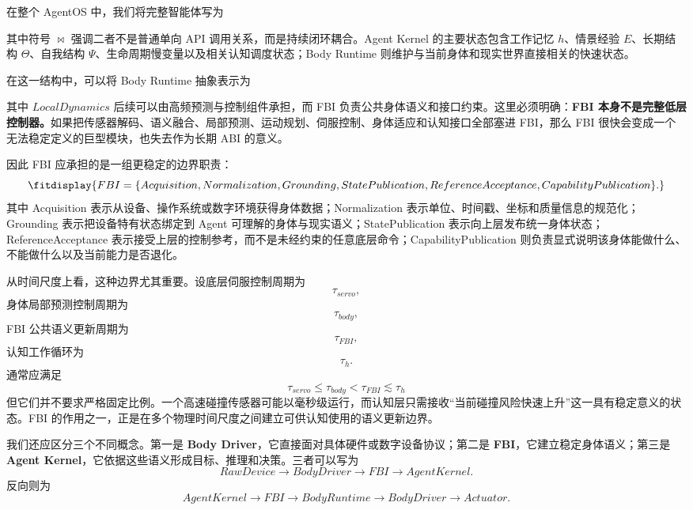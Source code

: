 在整个 AgentOS 中，我们将完整智能体写为
\begin{statementbox}
\centering
{}
\end{statementbox}
其中符号 \(\bowtie\) 强调二者不是普通单向 API 调用关系，而是持续闭环耦合。Agent Kernel 的主要状态包含工作记忆 \(h\)、情景经验 \(E\)、长期结构 \(\Theta\)、自我结构 \(\Psi\)、生命周期慢变量以及相关认知调度状态；Body Runtime 则维护与当前身体和现实世界直接相关的快速状态。

在这一结构中，可以将 Body Runtime 抽象表示为
\begin{statementbox}
\centering
{}
\end{statementbox}
其中 \(LocalDynamics\) 后续可以由高频预测与控制组件承担，而 FBI 负责公共身体语义和接口约束。这里必须明确：\textbf{FBI 本身不是完整低层控制器。}如果把传感器解码、语义融合、局部预测、运动规划、伺服控制、身体适应和认知接口全部塞进 FBI，那么 FBI 很快会变成一个无法稳定定义的巨型模块，也失去作为长期 ABI 的意义。

因此 FBI 应承担的是一组更稳定的边界职责：
\[
\fitdisplay{
FBI
=
\{
Acquisition,
Normalization,
Grounding,
StatePublication,
ReferenceAcceptance,
CapabilityPublication
\}.
}
\]
其中 Acquisition 表示从设备、操作系统或数字环境获得身体数据；Normalization 表示单位、时间戳、坐标和质量信息的规范化；Grounding 表示把设备特有状态绑定到 Agent 可理解的身体与现实语义；StatePublication 表示向上层发布统一身体状态；ReferenceAcceptance 表示接受上层的控制参考，而不是未经约束的任意底层命令；CapabilityPublication 则负责显式说明该身体能做什么、不能做什么以及当前能力是否退化。

从时间尺度上看，这种边界尤其重要。设底层伺服控制周期为
\[
\tau_{servo},
\]
身体局部预测控制周期为
\[
\tau_{body},
\]
FBI 公共语义更新周期为
\[
\tau_{FBI},
\]
认知工作循环为
\[
\tau_h.
\]
通常应满足
\[
\boxed{
\tau_{servo}
\leq
\tau_{body}
<
\tau_{FBI}
\lesssim
\tau_h
}
\]
但它们并不要求严格固定比例。一个高速碰撞传感器可能以毫秒级运行，而认知层只需接收“当前碰撞风险快速上升”这一具有稳定意义的状态。FBI 的作用之一，正是在多个物理时间尺度之间建立可供认知使用的语义更新边界。

我们还应区分三个不同概念。第一是 \textbf{Body Driver}，它直接面对具体硬件或数字设备协议；第二是 \textbf{FBI}，它建立稳定身体语义；第三是 \textbf{Agent Kernel}，它依据这些语义形成目标、推理和决策。三者可以写为
\[
RawDevice
\rightarrow
BodyDriver
\rightarrow
FBI
\rightarrow
AgentKernel.
\]
反向则为
\[
AgentKernel
\rightarrow
FBI
\rightarrow
BodyRuntime
\rightarrow
BodyDriver
\rightarrow
Actuator.
\]

